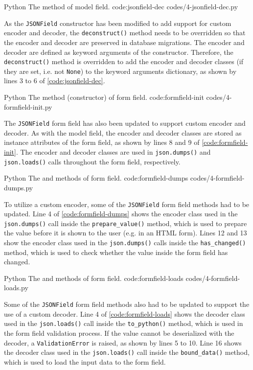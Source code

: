 \listing
{Python}
{The  method of  model field.}
{code:jsonfield-dec}
{codes/4-jsonfield-dec.py}

As the \verb|JSONField| constructor has been modified to add support for custom
encoder and decoder, the \verb|deconstruct()| method needs to be overridden so
that the encoder and decoder are preserved in database migrations. The encoder
and decoder are defined as keyword arguments of the constructor. Therefore, the
\verb|deconstruct()| method is overridden to add the encoder and decoder
classes (if they are set, i.e. not \verb|None|) to the keyword arguments
dictionary, as shown by lines 3 to 6 of \autoref{code:jsonfield-dec}.

\listing
{Python}
{The  method (constructor) of  form field.}
{code:formfield-init}
{codes/4-formfield-init.py}

The \verb|JSONField| form field has also been updated to support custom encoder
and decoder. As with the model field, the encoder and decoder classes are
stored as instance attributes of the form field, as shown by lines 8 and 9 of
\autoref{code:formfield-init}. The encoder and decoder classes are used in
\verb|json.dumps()| and \verb|json.loads()| calls throughout the form field,
respectively.

\listing
{Python}
{The  and  methods of
 form field.}
{code:formfield-dumps}
{codes/4-formfield-dumps.py}

To utilize a custom encoder, some of the \verb|JSONField| form field methods
had to be updated. Line 4 of \autoref{code:formfield-dumps} shows the encoder
class used in the \verb|json.dumps()| call inside the \verb|prepare_value()|
method, which is used to prepare the value before it is shown to the user (e.g.
in an HTML form). Lines 12 and 13 show the encoder class used in the
\verb|json.dumps()| calls inside the \verb|has_changed()| method, which is used
to check whether the value inside the form field has changed.

\listing
{Python}
{The  and  methods of 
form field.}
{code:formfield-loads}
{codes/4-formfield-loads.py}

Some of the \verb|JSONField| form field methods also had to be updated to
support the use of a custom decoder. Line 4 of \autoref{code:formfield-loads}
shows the decoder class used in the \verb|json.loads()| call inside the
\verb|to_python()| method, which is used in the form field validation process.
If the value cannot be deserialized with the decoder, a \verb|ValidationError|
is raised, as shown by lines 5 to 10. Line 16 shows the decoder class used in
the \verb|json.loads()| call inside the \verb|bound_data()| method, which is
used to load the input data to the form field.

